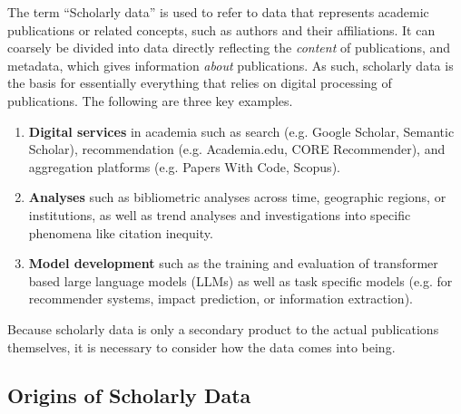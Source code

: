 The term ``Scholarly data'' is used to refer to data that represents academic publications or related concepts, such as authors and their affiliations. It can coarsely be divided into data directly reflecting the \emph{content} of publications, and metadata, which gives information \emph{about} publications.
As such, scholarly data is the basis for essentially everything that relies on digital processing of publications. The following are three key examples.
\begin{enumerate}
    \item \textbf{Digital services} in academia such as search (e.g. Google Scholar, Semantic Scholar), recommendation (e.g. Academia.edu, CORE Recommender), and aggregation platforms (e.g. Papers With Code, Scopus).  %
    \item \textbf{Analyses} such as bibliometric analyses across time, geographic regions, or institutions, as well as trend analyses and investigations into specific phenomena like citation inequity.
    \item \textbf{Model development} such as the training and evaluation of transformer based large language models (LLMs) as well as task specific models (e.g. for recommender systems, impact prediction, or information extraction).
\end{enumerate}

Because scholarly data is only a secondary product to the actual publications themselves, it is necessary to consider how the data comes into being.

\subsection{Origins of Scholarly Data}


